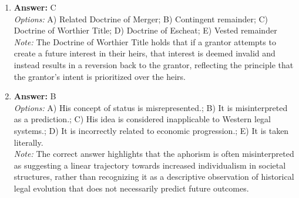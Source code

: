 \documentclass[12pt]{article}
\begin{document}
\begin{enumerate}[label=\arabic*.]
\item \textbf{Answer:} C
\\ \textit{Options:} A) Related Doctrine of Merger; B) Contingent remainder; C) Doctrine of Worthier Title; D) Doctrine of Escheat; E) Vested remainder
\\ \textit{Note:} The Doctrine of Worthier Title holds that if a grantor attempts to create a future interest in their heirs, that interest is deemed invalid and instead results in a reversion back to the grantor, reflecting the principle that the grantor's intent is prioritized over the heirs.
\item \textbf{Answer:} B
\\ \textit{Options:} A) His concept of status is misrepresented.; B) It is misinterpreted as a prediction.; C) His idea is considered inapplicable to Western legal systems.; D) It is incorrectly related to economic progression.; E) It is taken literally.
\\ \textit{Note:} The correct answer highlights that the aphorism is often misinterpreted as suggesting a linear trajectory towards increased individualism in societal structures, rather than recognizing it as a descriptive observation of historical legal evolution that does not necessarily predict future outcomes.
\end{enumerate}
\end{document}
